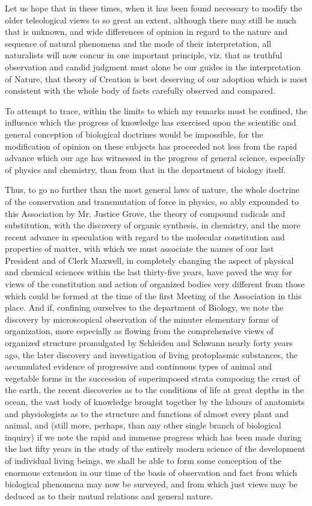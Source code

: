 \documentclass[a4paper, 11pt, oneside, english]{article}
\begin{document}
Let us hope that in these times, when it has been found necessary to modify the older teleological views to so great an extent, although there may still be much that is unknown, and wide differences of opinion in regard to the nature and sequence of natural phenomena and the mode of their interpretation, all naturalists will now concur in one important principle, viz. that as truthful observation and candid judgment must alone be our guides in the interpretation of Nature, that theory of Creation is best deserving of our adoption which is most consistent with the whole body of facts carefully observed and compared.

To attempt to trace, within the limits to which my remarks must be confined, the influence which the progress of knowledge has exercised upon the scientific and general conception of biological doctrines would be impossible, for the modification of opinion on these subjects has proceeded not less from the rapid advance which our age has witnessed in the progress of general science, especially of physics and chemistry, than from that in the department of biology itself.

Thus, to go no further than the most general laws of nature, the whole doctrine of the conservation and transmutation of force in physics, so ably expounded to this Association by Mr. Justice Grove, the theory of compound radicals and substitution, with the discovery of organic synthesis, in chemistry, and the more recent advance in speculation with regard to the molecular constitution and properties of matter, with which we must associate the names of our last President and of Clerk Maxwell, in completely changing the aspect of physical and chemical sciences within the last thirty-five years, have paved the way for views of the constitution and action of organized bodies very different from those which could be formed at the time of the first Meeting of the Association in this place. And if, confining ourselves to the department of Biology, we note the discovery by microscopical observation of the minuter elementary forms of organization, more especially as flowing from the comprehensive views of organized structure promulgated by Schleiden and Schwann nearly forty years ago, the later discovery and investigation of living protoplasmic substances, the accumulated evidence of progressive and continuous types of animal and vegetable forms in the succession of superimposed strata composing the crust of the earth, the recent discoveries as to the conditions of life at great depths in the ocean, the vast body of knowledge brought together by the labours of anatomists and physiologists as to the structure and functions of almost every plant and animal, and (still more, perhaps, than any other single branch of biological inquiry) if we note the rapid and immense progress which has been made during the last fifty years in the study of the entirely modern science of the development of individual living beings, we shall be able to form some conception of the enormous extension in our time of the basis of observation and fact from which biological phenomena may now be surveyed, and from which just views may be deduced as to their mutual relations and general nature.
\end{document}
